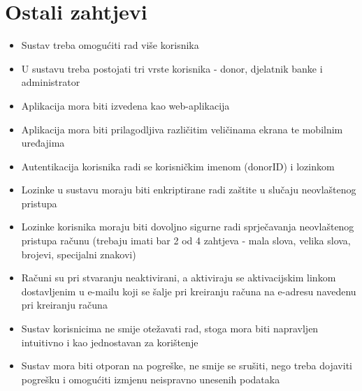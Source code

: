 				
				
	
		\section{Ostali zahtjevi}
		
		 
			 
			 \begin{itemize}
			     \item Sustav treba omogućiti rad više korisnika
			     \item U sustavu treba postojati tri vrste korisnika - donor, djelatnik banke i administrator
			     \item Aplikacija mora biti izvedena kao web-aplikacija
			     \item Aplikacija mora biti prilagodljiva različitim veličinama ekrana te mobilnim uređajima
			     \item Autentikacija korisnika radi se korisničkim imenom (donorID) i lozinkom
			     \item Lozinke u sustavu moraju biti enkriptirane radi zaštite u slučaju neovlaštenog pristupa
			     \item Lozinke korisnika moraju biti dovoljno sigurne radi sprječavanja neovlaštenog pristupa računu (trebaju imati bar 2 od 4 zahtjeva - mala slova, velika slova, brojevi, specijalni znakovi) 
			     \item Računi su pri stvaranju neaktivirani, a aktiviraju se aktivacijskim linkom dostavljenim u e-mailu koji se šalje pri kreiranju računa na e-adresu navedenu pri kreiranju računa
			     \item Sustav korisnicima ne smije otežavati rad, stoga mora biti napravljen intuitivno i kao jednostavan za korištenje
			     \item Sustav mora biti otporan na pogreške, ne smije se srušiti, nego treba dojaviti pogrešku i omogućiti izmjenu neispravno unesenih podataka
			 \end{itemize}
			 
			 
			 
	
